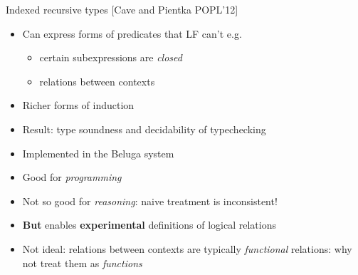 \documentclass[usenames,dvipsnames]{beamer}
\begin{document}

\begin{frame}{Indexed recursive types [Cave and Pientka POPL'12]}
\begin{itemize}
\item Can express forms of predicates that LF can't e.g.
\begin{itemize}
\item certain subexpressions are \emph{closed}
\item relations between contexts
\end{itemize}
\item Richer forms of induction
\item Result: type soundness and decidability of typechecking
\item Implemented in the Beluga system
\item Good for \emph{programming}
\item Not so good for \emph{reasoning}: naive treatment is inconsistent!
\item \textbf{But} enables \textbf{experimental} definitions of logical relations
\item Not ideal: relations between contexts are typically \emph{functional} relations: why not treat them as \emph{functions}
\end{itemize}
\end{frame}
\end{document}
